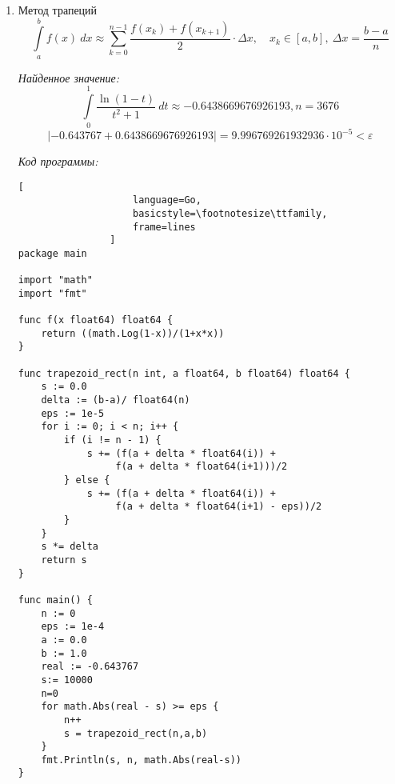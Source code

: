 \documentclass[14pt, a4paper, titlepage, fleqn]{extarticle}
\begin{document}
\begin{enumerate}
\begin{lstlisting}[
                    language=Go,
                    basicstyle=\footnotesize\ttfamily,
                    frame=lines
                ]
func main() {
    n := 0
    eps := 1e-4
    a := 0.0
    b := 1.0
    real := -0.643767
    s := 10000
    n=0
    for math.Abs(real - s) >= eps {
        n++
        s = center_rect(n,a,b)
    }
    fmt.Println(s, n, math.Abs(real-s))
}
                \end{lstlisting}
                
                \item Метод трапеций
                \[
                    \int\limits_a^b f(x) ~ dx \approx
                    \sum_{k=0}^{n-1} 
                    \frac{f\left( x_k \right) + f\left(x_{k+1}\right)}{2}
                    \cdot \Delta x,
                    \quad x_k \in [a, b], ~ \Delta x = \frac{b-a}{n}    
                \]

                \textit{Найденное значение:}
                \[
                    \int\limits_0^1 \frac{\ln(1-t)}{t^2+1} ~ dt \approx
                    -0.6438669676926193, n = 3676
                \]
                \[
                    |-0.643767+0.6438669676926193| = 9.996769261932936
                    \cdot 10^{-5} < \varepsilon
                \]

                \textit{Код программы:}
                \begin{lstlisting}[
                    language=Go,
                    basicstyle=\footnotesize\ttfamily,
                    frame=lines
                ]
package main

import "math"
import "fmt"

func f(x float64) float64 {
    return ((math.Log(1-x))/(1+x*x))
}

func trapezoid_rect(n int, a float64, b float64) float64 {
    s := 0.0
    delta := (b-a)/ float64(n)
    eps := 1e-5
    for i := 0; i < n; i++ {
        if (i != n - 1) {
            s += (f(a + delta * float64(i)) +
                 f(a + delta * float64(i+1)))/2
        } else {
            s += (f(a + delta * float64(i)) +
                 f(a + delta * float64(i+1) - eps))/2
        }
    }
    s *= delta
    return s
}

func main() {
    n := 0
    eps := 1e-4
    a := 0.0
    b := 1.0
    real := -0.643767
    s:= 10000
    n=0
    for math.Abs(real - s) >= eps {
        n++
        s = trapezoid_rect(n,a,b)
    }
    fmt.Println(s, n, math.Abs(real-s))
}
                \end{lstlisting}
            \end{enumerate}

    \pagebreak
\end{document}
